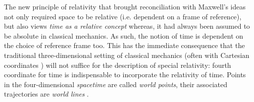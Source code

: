 The new principle of relativity that brought reconciliation with Maxwell's ideas not only required space to be relative (i.e. dependent on a frame of reference), but also views \emph{time as a relative concept} whereas, it had always been assumed to be absolute in classical mechanics. As such, the notion of time is dependent on the choice of reference frame too. This has the immediate consequence that the traditional three-dimensional setting of classical mechanics (often with Cartesian coordinates ) will not suffice for the description of special relativity:  fourth coordinate for time is indispensable to incorporate the relativity of time. Points in the four-dimensional \emph{spacetime} are called \emph{world points}, their associated trajectories are \emph{world lines} \cite{Landau1971}.

